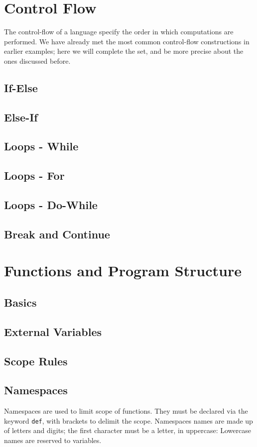 \documentclass{scrartcl}
\begin{document}
    \section{Control Flow}
        The control-flow of a language specify the order in which computations
        are performed. We have already met the most common control-flow constructions
        in earlier examples; here we will complete the set, and be more precise
        about the ones discussed before.
        \subsection{If-Else}
        \subsection{Else-If}
        \subsection{Loops - While}
        \subsection{Loops - For}
        \subsection{Loops - Do-While}
        \subsection{Break and Continue}
    \section{Functions and Program Structure}
        \subsection{Basics}
        \subsection{External Variables}
        \subsection{Scope Rules}
        \subsection{Namespaces} \label{namespaces}
            Namespaces are used to limit scope of functions. They must be declared
            via the keyword \texttt{def}, with brackets to delimit the scope.
            Namespaces names are made up of letters and digits; the first character
            must be a letter, in uppercase: Lowercase names are reserved to variables.
\end{document}
